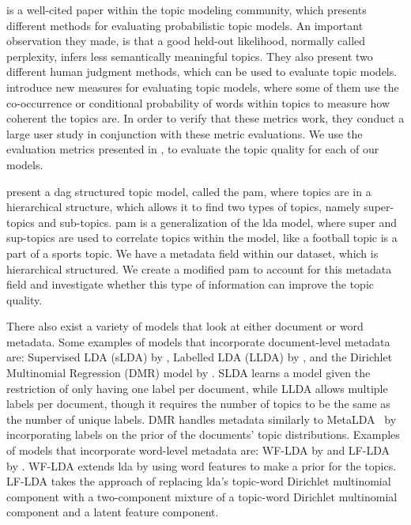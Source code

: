 \citet{tea_leaves} is a well-cited paper within the topic modeling community, which presents different methods for evaluating probabilistic topic models. 
An important observation they made, is that a good held-out likelihood, normally called perplexity, infers less semantically meaningful topics.
They also present two different human judgment methods, which can be used to evaluate topic models.
\citet{topic_coherence_2015} introduce new measures for evaluating topic models, where some of them use the co-occurrence or conditional probability of words within topics to measure how coherent the topics are. 
In order to verify that these metrics work, they conduct a large user study in conjunction with these metric evaluations.
We use the evaluation metrics presented in \citet{topic_coherence_2015}, to evaluate the topic quality for each of our models.

\citet{li2006pachinko} present a \gls{dag} structured topic model, called the \gls{pam}, where topics are in a hierarchical structure, which allows it to find two types of topics, namely super-topics and sub-topics. 
\gls{pam} is a generalization of the \gls{lda} model, where super and sup-topics are used to correlate topics within the model, like a football topic is a part of a sports topic.
We have a metadata field within our dataset, which is hierarchical structured.
We create a modified \gls{pam} to account for this metadata field and investigate whether this type of information can improve the topic quality.

There also exist a variety of models that look at either document or word metadata.
Some examples of models that incorporate document-level metadata are: Supervised LDA (sLDA) by \citet{blei2010supervised}, Labelled LDA (LLDA) by \citet{llda2009}, and the Dirichlet Multinomial Regression (DMR) model by \citet{mimno2008topic}.
SLDA learns a model given the restriction of only having one label per document, while LLDA allows multiple labels per document, though it requires the number of topics to be the same as the number of unique labels.
DMR handles metadata similarly to MetaLDA~\cite{MetaLDA2017} by incorporating labels on the prior of the documents' topic distributions.
Examples of models that incorporate word-level metadata are: WF-LDA by \citet{wf-lda2010} and LF-LDA by \citet{lf-lda2015}.
WF-LDA extends \gls{lda} by using word features to make a prior for the topics.
LF-LDA takes the approach of replacing \gls{lda}'s topic-word Dirichlet multinomial component with a two-component mixture of a topic-word Dirichlet multinomial component and a latent feature component.

